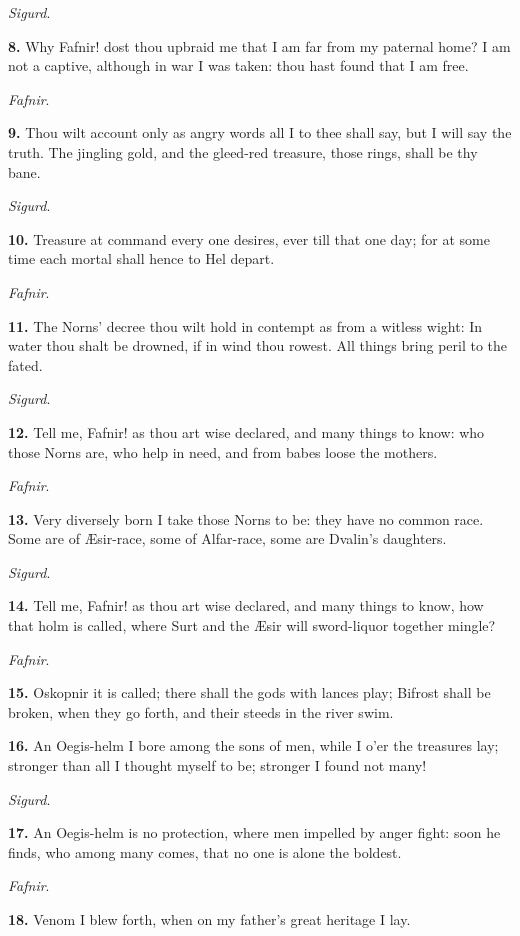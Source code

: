 \emph{Sigurd}.

\textbf{8.} Why Fafnir! dost thou upbraid me that I am far from my paternal
home? I am not a captive, although in war I was taken: thou hast found
that I am free.

\emph{Fafnir}.

\textbf{9.} Thou wilt account only as angry words all I to thee shall say,
but I will say the truth. The jingling gold, and the gleed-red
treasure, those rings, shall be thy bane.

\emph{Sigurd}.

\textbf{10.} Treasure at command every one desires, ever till that one day;
for at some time each mortal shall hence to Hel depart.

\emph{Fafnir}.

\textbf{11.} The Norns' decree thou wilt hold in contempt as from a witless
wight: In water thou shalt be drowned, if in wind thou rowest. All
things bring peril to the fated.

\emph{Sigurd}.

\textbf{12.} Tell me, Fafnir! as thou art wise declared, and many things to
know: who those Norns are, who help in need, and from babes loose the
mothers.

\emph{Fafnir}.

\textbf{13.} Very diversely born I take those Norns to be: they have no
common race. Some are of Æsir-race, some of Alfar-race, some are
Dvalin's daughters.

\emph{Sigurd}.

\textbf{14.} Tell me, Fafnir! as thou art wise declared, and many things to
know, how that holm is called, where Surt and the Æsir will
sword-liquor together mingle?

\emph{Fafnir}.

\textbf{15.} Oskopnir it is called; there shall the gods with lances play;
Bifrost shall be broken, when they go forth, and their steeds in the
river swim.

\textbf{16.} An Oegis-helm I bore among the sons of men, while I o'er the
treasures lay; stronger than all I thought myself to be; stronger I
found not many!

\emph{Sigurd}.

\textbf{17.} An Oegis-helm is no protection, where men impelled by anger
fight: soon he finds, who among many comes, that no one is alone the
boldest.

\emph{Fafnir}.

\textbf{18.} Venom I blew forth, when on my father's great heritage I lay.


